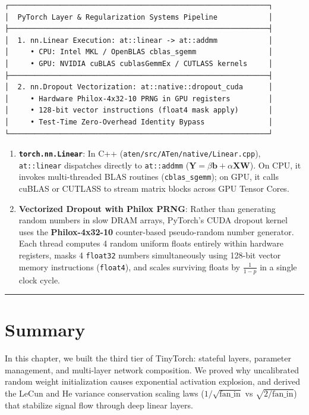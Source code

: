 \documentclass[
  letterpaper,
]{scrbook}
\providecommand{\tightlist}{%
  \setlength{\itemsep}{0pt}\setlength{\parskip}{0pt}}
\begin{document}
\begin{verbatim}
┌─────────────────────────────────────────────────────────────┐
│  PyTorch Layer & Regularization Systems Pipeline            │
├─────────────────────────────────────────────────────────────┤
│  1. nn.Linear Execution: at::linear -> at::addmm            │
│     • CPU: Intel MKL / OpenBLAS cblas_sgemm                 │
│     • GPU: NVIDIA cuBLAS cublasGemmEx / CUTLASS kernels     │
├─────────────────────────────────────────────────────────────┤
│  2. nn.Dropout Vectorization: at::native::dropout_cuda      │
│     • Hardware Philox-4x32-10 PRNG in GPU registers         │
│     • 128-bit vector instructions (float4 mask apply)       │
│     • Test-Time Zero-Overhead Identity Bypass               │
└─────────────────────────────────────────────────────────────┘
\end{verbatim}

\begin{enumerate}
\def\labelenumi{\arabic{enumi}.}
\tightlist
\item
  \textbf{\texttt{torch.nn.Linear}}: In C++
  (\texttt{aten/src/ATen/native/Linear.cpp}), \texttt{at::linear}
  dispatches directly to \texttt{at::addmm}
  (\(\mathbf{Y} = \beta \mathbf{b} + \alpha \mathbf{X} \mathbf{W}\)). On
  CPU, it invokes multi-threaded BLAS routines (\texttt{cblas\_sgemm});
  on GPU, it calls cuBLAS or CUTLASS to stream matrix blocks across GPU
  Tensor Cores.
\item
  \textbf{Vectorized Dropout with Philox PRNG}: Rather than generating
  random numbers in slow DRAM arrays, PyTorch's CUDA dropout kernel uses
  the \textbf{Philox-4x32-10} counter-based pseudo-random number
  generator. Each thread computes 4 random uniform floats entirely
  within hardware registers, masks 4 \texttt{float32} numbers
  simultaneously using 128-bit vector memory instructions
  (\texttt{float4}), and scales surviving floats by \(\frac{1}{1-p}\) in
  a single clock cycle.
\end{enumerate}

\begin{center}\rule{0.5\linewidth}{0.5pt}\end{center}

\section{Summary}\label{summary-3}

In this chapter, we built the third tier of TinyTorch: stateful layers,
parameter management, and multi-layer network composition. We proved why
uncalibrated random weight initialization causes exponential activation
explosion, and derived the LeCun and He variance conservation scaling
laws (\(1/\sqrt{\text{fan\_in}}\) vs \(\sqrt{2/\text{fan\_in}}\)) that
stabilize signal flow through deep linear layers.
\end{document}
